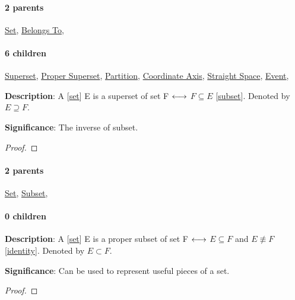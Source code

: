 \documentclass[../main.tex]{subfiles}
\begin{document}
\paragraph{2 parents} \hyperref[statement:Set]{Set}, \hyperref[statement:Belongs To]{Belongs To}, 
\paragraph{6 children} \hyperref[statement:Superset]{Superset}, \hyperref[statement:Proper Superset]{Proper Superset}, \hyperref[statement:Partition]{Partition}, \hyperref[statement:Coordinate Axis]{Coordinate Axis}, \hyperref[statement:Straight Space]{Straight Space}, \hyperref[statement:Event]{Event}, 



\begin{statement}
\label{statement:Superset}\hspace*{0pt}\par
\end{statement}
\textbf{Description}:
A [\hyperref[statement:Set]{set}] E is a superset of set F $ \longleftrightarrow $ $ F \subseteq E $ [\hyperref[statement:Subset]{subset}]. Denoted by $ E \supseteq F $.
\par
{\color{magenta} \textbf{Significance}:
The inverse of subset.
\par}
\begin{proof}
\proofbydefinition
\end{proof}\par
\paragraph{2 parents} \hyperref[statement:Set]{Set}, \hyperref[statement:Subset]{Subset}, 
\paragraph{0 children} 



\begin{statement}
\label{statement:Proper Subset}\hspace*{0pt}\par
\end{statement}
\textbf{Description}:
A [\hyperref[statement:Set]{set}] E is a proper subset of set F $ \longleftrightarrow $  $ E \subseteq F $ and $ E \not\equiv F $ [\hyperref[statement:Identity]{identity}]. Denoted by $ E \subset F $.
\par
{\color{magenta} \textbf{Significance}:
Can be used to represent useful pieces of a set.
\par}
\begin{proof}
\proofbydefinition
\end{proof}\par
\end{document}
